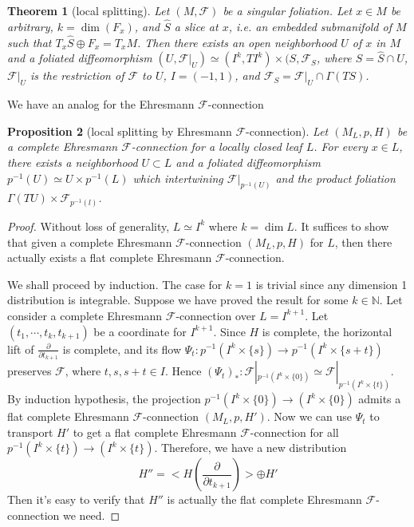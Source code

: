 \documentclass[12pt]{amsart}
\newtheorem{thm}{Theorem}[section]
\newtheorem{prop}[thm]{Proposition}
\theoremstyle{definition}
\theoremstyle{remark}
\numberwithin{equation}{section}
\newcommand{\del}{\partial}
\renewcommand{\del}{\partial}
\newcommand{\CF}{{\mathcal F}}
\newcommand{\N}{{\mathbb{N}}}
\newcommand{\1}{{\mathbb{1}}}
\begin{document}
\begin{thm}[local splitting]
    Let $(M, \CF)$ be a singular foliation. Let $x \in M$ be arbitrary, $k = \dim(F_x)$, and $\hat{S}$ a slice at $x$, i.e. an embedded submanifold of $M$ such that $T_x \hat{S} \oplus F_x = T_x M$. Then there exists an open neighborhood $U$ of $x$ in $M$ and a foliated diffeomorphism $(U, \CF|_U) \simeq (I^k, TI^k) \times (S, \CF_S$, where $S = \hat{S} \cap U$, $\CF|_U$ is the restriction of $\CF$ to $U$, $I = (-1, 1)$, and $\CF_S = \CF|_U \cap \Gamma(TS)$.
\end{thm}

We have an analog for the Ehresmann $\CF$-connection
\begin{prop}[local splitting by Ehresmann $\CF$-connection]
Let $(M_L, p, H)$ be a complete Ehresmann $\CF$-connection for a locally closed leaf $L$. For every $x\in L$, there exists a neighborhood $U \subset L$ and a foliated diffeomorphism $p^{-1}(U) \simeq U \times p^{-1}(L)$ which intertwining $\CF|_{p^{-1}(U)}$ and the product foliation $\Gamma(TU) \times \CF_{p^{-1}(l)}$.
\end{prop}
\begin{proof}
Without loss of generality, $L\simeq I^k$ where $k = \dim L$. It suffices to show that given a complete Ehresmann $\CF$-connection $(M_L, p, H)$ for $L$, then there actually exists a flat complete Ehresmann $\CF$-connection. 

We shall proceed by induction. The case for $k = 1$ is trivial since any dimension 1 distribution is integrable. Suppose we have proved the result for some $k \in \N$. Let consider a complete Ehresmann $\CF$-connection over $L = I^{k+1}$. Let $(t_1, \cdots, t_k, t_{k+1})$ be a coordinate for $I^{k+1}$. Since $H$ is complete, the horizontal lift of $\frac{\del}{\del t_{k+1}}$ is complete, and its flow $\Psi_t: p^{-1}(I^k \times \{s\}) \to p^{-1}(I^k \times \{s + t\})$ preserves $\CF$, where $t, s, s+t \in I$. Hence $(\Psi_t)_*: \CF|_{p^{-1}(I^k \times \{0\})} \simeq \CF|_{p^{-1}(I^k \times \{t\})}$. By induction hypothesis, the projection $p^{-1}(I^k \times \{0\}) \to (I^k \times \{0\})$ admits a flat complete Ehresmann $\CF$-connection $(M_L, p, H')$. Now we can use $\Psi_t$ to transport $H'$ to get a flat complete Ehresmann $\CF$-connection for all $p^{-1}(I^k \times \{t\}) \to (I^k \times \{t\})$. Therefore, we have a new distribution
\begin{equation*}
    H'' = <H(\frac{\del}{\del t_{k + 1}})> \oplus H'
\end{equation*}
Then it's easy to verify that $H''$ is actually the flat complete Ehresmann $\CF$-connection we need.
\end{proof}
\end{document}
